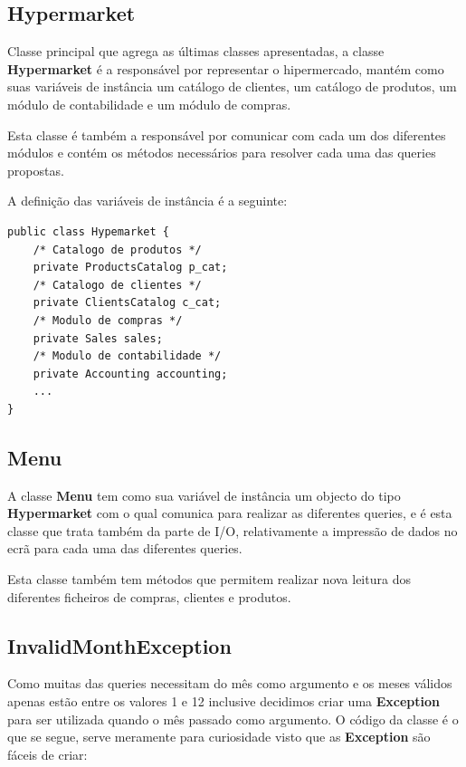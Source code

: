 \documentclass[10pt] {article}
\begin{document}
\subsection{Hypermarket}
\par Classe principal que agrega as últimas classes apresentadas, a classe \color{blue} \textbf{Hypermarket} \color{black} 
é a responsável por representar o hipermercado, mantém como suas variáveis de instância um catálogo de clientes, 
um catálogo de produtos, um módulo de contabilidade e um módulo de compras.
\par Esta classe é também a responsável por comunicar com cada um dos diferentes módulos e contém os métodos 
necessários para resolver cada uma das queries propostas.
\par A definição das variáveis de instância é a seguinte:

\begin{lstlisting}
public class Hypemarket {
	/* Catalogo de produtos */
	private ProductsCatalog p_cat;
	/* Catalogo de clientes */
	private ClientsCatalog c_cat;
	/* Modulo de compras */
	private Sales sales;
	/* Modulo de contabilidade */
	private Accounting accounting;
	...
}
\end{lstlisting}

\subsection{Menu}
\par A classe \color{blue} \textbf{Menu} \color{black} tem como sua variável de instância um objecto do tipo
\color{blue} \textbf{Hypermarket} \color{black} com o qual comunica para realizar as diferentes queries, e é esta classe que trata 
também da parte de I/O, relativamente a impressão de dados no ecrã para cada uma das diferentes queries.
\par Esta classe também tem métodos que permitem realizar nova leitura dos diferentes ficheiros de compras, clientes e
produtos.

\subsection{InvalidMonthException}
\par Como muitas das queries necessitam do mês como argumento e os meses válidos apenas estão entre os valores 1 e 12 
inclusive decidimos criar uma \color{blue} \textbf{Exception} \color{black} para ser utilizada quando o mês passado como 
argumento. O código da classe é o que se segue, serve meramente para curiosidade visto que as \color{blue} 
\textbf{Exception} \color{black} são fáceis de criar:
\end{document}
